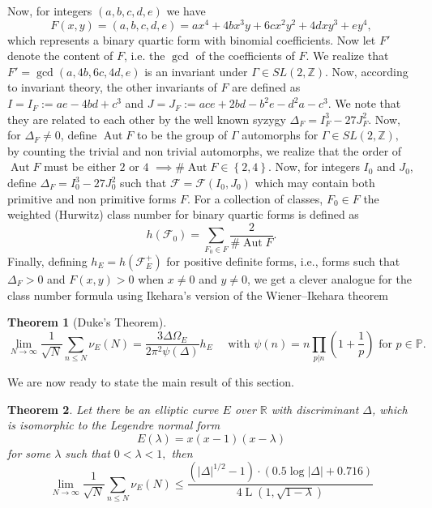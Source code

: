\documentclass[12pt]{amsart}
\theoremstyle{plain}
\newtheorem{thm}{Theorem}
\newtheorem*{unnumberedqn}{Question}
\theoremstyle{definition}
\theoremstyle{remark}
\numberwithin{equation}{section}
\numberwithin{thm}{section}
\theoremstyle{named}
\theoremstyle{named}
\begin{document}

\noindent Now, for integers $(a,b,c,d,e)$ we have $$F(x,y) = (a,b,c,d,e) = ax^4 + 4bx^3y + 6cx^2y^2 + 4dxy^3 + ey^4,$$ which represents a binary quartic form with binomial coefficients. Now let $F'$ denote the content of $F$, i.e. the $\gcd$ of the coefficients of $F$. We realize that $F' = \gcd(a, 4b, 6c, 4d, e)$ is an invariant under $\Gamma \in SL(2,\mathbb{Z})$.
 Now, according to invariant theory, the other invariants of $F$ are defined as $I = I_F := ae - 4bd + c^3$ and $J = J_F := ace + 2bd -b^2e  - d^2a  - c^3.$ We note that they are related to each other by the well known syzygy $\Delta_{F} = I_{F}^3 - 27 J_{F}^2.$ Now, for $\Delta_{F} \neq 0 $, define $\operatorname{Aut} F$ to be the group of $\Gamma $ automorphs for $\Gamma \in SL(2, \mathbb{Z}),$ by counting the trivial and non trivial automorphs, we realize that the order of $\operatorname{Aut} F $ must be either $2$ or $4$ $\implies $$\# \operatorname{Aut} F \in \left\{2,4 \right\}$. Now, for integers $I_0$ and $J_0$, define $\Delta_{F} = I_{0}^3 - 27 J_{0}^2$ such that $\mathcal{F} = \mathcal{F}(I_0, J_0) $ which may contain both primitive and non primitive forms $F$. For a collection of classes,  $F_0 \in F$ the weighted (Hurwitz) class number for binary quartic forms is defined as $$h( \mathcal F_0) = \sum_{F_{0} \in F}  \dfrac{2}{\# \operatorname{Aut} F}.$$ Finally, defining $h_{E} = h(\mathcal F_{E}^{+})$ for positive definite forms, i.e., forms such that $\Delta_{F} > 0 $ and $F(x,y) > 0 $ when $x \neq 0 $ and $y \neq 0$, we get a clever analogue for the class number formula using Ikehara's version of the Wiener–Ikehara theorem
 \begin{thm}[{Duke's Theorem}]\label{Wiener-Ikehara}
 $$
\lim_{N \to \infty} \frac{1}{\sqrt{N}} \sum_{n \le N} \nu_{E}(N)  = \frac{3 \Delta \Omega_E}{2 \pi^2 \psi(\Delta)} h_E  \quad \text{ with }\psi(n) = n \prod_{p |n} \left(1 + \frac{1}{p}\right) \text{ for } p \in \mathbb{P}. 
$$
\end{thm} 
We are now ready to state the main result of this section.
\begin{thm}\label{explicitBound}
    Let there be an elliptic curve $E$ over $\mathbb{R}$ with discriminant $\Delta$, which is isomorphic to the Legendre normal form $$E(\lambda) = x(x-1)(x - \lambda)$$ for some $\lambda$ such that $0 < \lambda < 1,$ then $$ \lim_{N \to \infty} \frac{1}{\sqrt{N}} \sum_{n \le N} \nu_E(N) \le \frac{(|\Delta|^{1/2} - 1) \cdot (0.5 \log |\Delta| +0.716)}{4 \operatorname{L} \left(1, \sqrt{1 - \lambda}\right)}$$

\end{thm}$$
\end{document}
